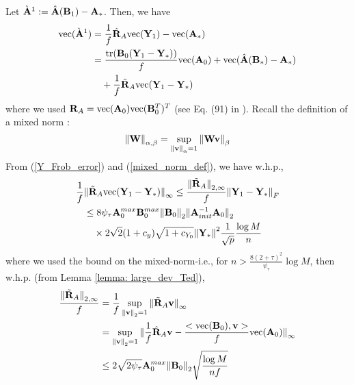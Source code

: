 \begin{IEEEproof}
Let $\grave{{\mathbf{A}}}^1:=\hat{{\mathbf{A}}}({\mathbf{B}}_1) - {\mathbf{A}}_*$. Then, we have
\begin{align}
	{ \text{vec} }(\grave{{\mathbf{A}}}^1) &= \frac{1}{f} \hat{{\mathbf{R}}}_A { \text{vec} }({\mathbf{Y}}_1) - { \text{vec} }({\mathbf{A}}_*) \nonumber \\
		&= \frac{{ \text{tr} }({\mathbf{B}}_0({\mathbf{Y}}_1-{\mathbf{Y}}_*))}{f} { \text{vec} }({\mathbf{A}}_0) + { \text{vec} }(\hat{{\mathbf{A}}}({\mathbf{B}}_*)-{\mathbf{A}}_*) \nonumber \\
		&\quad + \frac{1}{f} \tilde{{\mathbf{R}}}_A { \text{vec} }({\mathbf{Y}}_1-{\mathbf{Y}}_*) \label{grave_A_1}
\end{align}
where we used ${\mathbf{R}}_A={ \text{vec} }({\mathbf{A}}_0){ \text{vec} }({\mathbf{B}}_0^T)^T$ (see Eq. (91) in \cite{EstCovMatKron}). Recall the definition of a mixed norm \cite{HornJohnson}:
\begin{equation} \label{mixed_norm_def}
	{ \parallel } {\mathbf{W}} { \parallel }_{\alpha,\beta} = \sup_{{ \parallel } { \mathbf{v} } { \parallel }_{\alpha}=1} { \parallel } {\mathbf{W}} { \mathbf{v} } { \parallel }_\beta
\end{equation}
From (\ref{Y_Frob_error}) and (\ref{mixed_norm_def}), we have w.h.p.,
\begin{align}
	\frac{1}{f} & { \parallel } \tilde{{\mathbf{R}}}_A { \text{vec} }({\mathbf{Y}}_1-{\mathbf{Y}}_*){ \parallel }_\infty \leq \frac{{ \parallel } \tilde{{\mathbf{R}}}_A { \parallel }_{2,\infty}}{f} { \parallel } {\mathbf{Y}}_1-{\mathbf{Y}}_* { \parallel }_F \nonumber \\
		&\leq 8\psi_\tau {\mathbf{A}}_0^{max} {\mathbf{B}}_0^{max} { \parallel }{\mathbf{B}}_0{ \parallel }_2 { \parallel }{\mathbf{A}}_{init}^{-1}{\mathbf{A}}_0{ \parallel }_2 \nonumber \\
		&\quad \times 2\sqrt{2}(1+c_y)\sqrt{1+c_{Y_0}} { \parallel }{\mathbf{Y}}_*{ \parallel }^2  \frac{1}{\sqrt{p}} \frac{\log M}{n} \label{bound_infty}
\end{align}
where we used the bound on the mixed-norm-i.e., for $n>\frac{8(2+\tau)^2}{\psi_{\tau}} \log M$, then w.h.p. (from Lemma \ref{lemma: large_dev_Ted}),
\begin{align*}
	\frac{{ \parallel } \tilde{{\mathbf{R}}}_A { \parallel }_{2,\infty}}{f} &=\frac{1}{f} \sup_{{ \parallel } \mathbf{v}{ \parallel }_2=1} { \parallel } \tilde{{\mathbf{R}}}_A \mathbf{v}{ \parallel }_\infty \\\
		&= \sup_{{ \parallel } \mathbf{v}{ \parallel }_2=1} { \parallel } \frac{1}{f} \hat{{\mathbf{R}}}_A \mathbf{v} - \frac{<{ \text{vec} }({\mathbf{B}}_0),\mathbf{v}>}{f} { \text{vec} }({\mathbf{A}}_0) { \parallel }_\infty \nonumber \\
		&\leq 2\sqrt{2\psi_\tau} {\mathbf{A}}_0^{max} { \parallel }{\mathbf{B}}_0{ \parallel }_2  \sqrt{\frac{\log M}{nf}}
\end{align*}



\end{IEEEproof}
